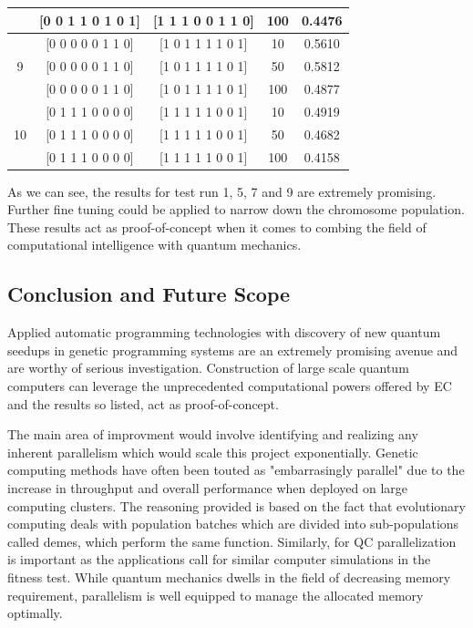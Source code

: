 \documentclass[conference]{IEEEtran}
\begin{document}
\begin{table}[!t]
{\begin{tabular}{| c | c | c | c | c |}
 & [0 0 1 1 0 1 0 1] & [1 1 1 0 0 1 1 0] & 100 & 0.4476 \\
\hline
 & [0 0 0 0 0 1 1 0] & [1 0 1 1 1 1 0 1] & 10 & 0.5610 \\
9 & [0 0 0 0 0 1 1 0] & [1 0 1 1 1 1 0 1] & 50 & 0.5812 \\
 & [0 0 0 0 0 1 1 0] & [1 0 1 1 1 1 0 1] & 100 & 0.4877 \\
\hline
 & [0 1 1 1 0 0 0 0] & [1 1 1 1 1 0 0 1] & 10  & 0.4919 \\
10 & [0 1 1 1 0 0 0 0] & [1 1 1 1 1 0 0 1] & 50  & 0.4682 \\
 & [0 1 1 1 0 0 0 0] & [1 1 1 1 1 0 0 1] & 100  & 0.4158 \\
\hline
\end{tabular}
}
\end{table}

As we can see, the results for test run 1, 5, 7 and 9 are extremely promising. Further fine tuning could be applied to narrow down the chromosome population. These results act as proof-of-concept when it comes to combing the field of computational intelligence with quantum mechanics. 

\subsection{Conclusion and Future Scope}

Applied automatic programming technologies with discovery of new quantum seedups in genetic programming systems are an extremely promising avenue and are worthy of serious investigation. Construction of large scale quantum computers can leverage the unprecedented computational powers offered by EC and the results so listed, act as proof-of-concept.

The main area of improvment would involve identifying and realizing any inherent parallelism which would scale this project exponentially. Genetic computing methods have often been touted as "embarrasingly parallel" due to the increase in throughput and overall performance when deployed on large computing clusters. The reasoning provided is based on the fact that evolutionary computing deals with population batches which are divided into sub-populations called demes, which perform the same function. Similarly, for QC  parallelization is important as the applications call for similar computer simulations in the fitness test. While quantum mechanics dwells in the field of decreasing memory requirement, parallelism is well equipped to manage the allocated memory optimally.  
\end{document}
